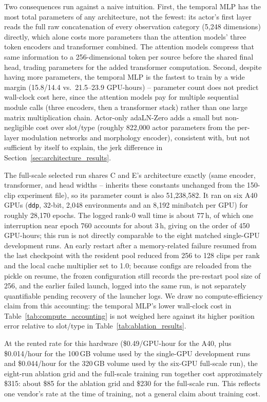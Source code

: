 Two consequences run against a naive intuition. First, the temporal MLP has
the most total parameters of any architecture, not the fewest: its actor's
first layer reads the full raw concatenation of every observation category
(5,248 dimensions) directly, which alone costs more parameters than the
attention models' three token encoders and transformer combined. The
attention models compress that same information to a 256-dimensional token
per source before the shared final head, trading parameters for the added
transformer computation. Second, despite having more parameters, the temporal
MLP is the fastest to train by a wide margin (15.8/14.4 vs.\ 21.5--23.9
GPU-hours) -- parameter count does not predict wall-clock cost here, since the
attention models pay for multiple sequential module calls (three encoders,
then a transformer stack) rather than one large matrix multiplication chain.
Actor-only adaLN-Zero adds a small but non-negligible cost over slot/type
(roughly 822,000 actor parameters from the per-layer modulation networks and
morphology encoder), consistent with, but not sufficient by itself to
explain, the jerk difference in Section~\ref{sec:architecture_results}.

The full-scale selected run shares C and E's architecture exactly (same
encoder, transformer, and head widths --
 inherits these
constants unchanged from the 150-clip experiment file), so its parameter
count is also 51,238,582. It ran on six A40 GPUs (\texttt{ddp}, 32-bit,
2,048 environments and an 8,192 minibatch per GPU) for roughly 28,170
epochs. The logged rank-0 wall time is about 77\,h, of which one interruption
near epoch 760 accounts for about 3\,h, giving on the order of 450 GPU-hours;
this run is not directly comparable to the eight matched single-GPU
development runs. An early restart after a memory-related failure resumed
from the last checkpoint with the resident pool reduced from 256 to 128
clips per rank and the local cache multiplier set to 1.0; because configs
are reloaded from the pickle on resume, the frozen configuration still
records the pre-restart pool size of 256, and the earlier failed launch,
logged into the same run, is not separately quantifiable pending recovery of
the launcher logs. We draw no compute-efficiency claim from this accounting:
the temporal MLP's lower wall-clock cost in Table~\ref{tab:compute_accounting}
is not weighed here against its higher position error relative to slot/type
in Table~\ref{tab:ablation_results}.

At the rented rate for this hardware (\$0.49/GPU-hour for the A40, plus
\$0.014/hour for the 100\,GB volume used by the single-GPU development runs
and \$0.044/hour for the 320\,GB volume used by the six-GPU full-scale run),
the eight-run ablation grid and the full-scale training run together cost
approximately \$315: about \$85 for the ablation grid and \$230 for the
full-scale run. This reflects one vendor's rate at the time of training, not
a general claim about training cost.
